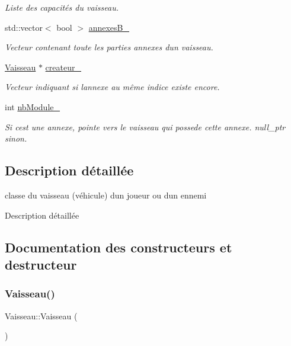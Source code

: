 \begin{DoxyCompactItemize}
\begin{DoxyCompactList}\small\item\em Liste des capacités du vaisseau. \end{DoxyCompactList}\item 
std\+::vector$<$ bool $>$ \hyperlink{class_vaisseau_a584960419ccc6ae137c196a012d7eb9f}{annexes\+B\+\_\+}
\begin{DoxyCompactList}\small\item\em Vecteur contenant toute les parties annexes d\textquotesingle{}un vaisseau. \end{DoxyCompactList}\item 
\hyperlink{class_vaisseau}{Vaisseau} $\ast$ \hyperlink{class_vaisseau_a838e50295284e3b4996640054ab7ee30}{createur\+\_\+}
\begin{DoxyCompactList}\small\item\em Vecteur indiquant si l\textquotesingle{}annexe au même indice existe encore. \end{DoxyCompactList}\item 
int \hyperlink{class_vaisseau_a540cc03e47db59aad60d70be38a010ec}{nb\+Module\+\_\+}
\begin{DoxyCompactList}\small\item\em Si c\textquotesingle{}est une annexe, pointe vers le vaisseau qui possede cette annexe. null\+\_\+ptr sinon. \end{DoxyCompactList}\end{DoxyCompactItemize}


\subsection{Description détaillée}
classe du vaisseau (véhicule) d\textquotesingle{}un joueur ou d\textquotesingle{}un ennemi 

Description détaillée 

\subsection{Documentation des constructeurs et destructeur}
\mbox{\label{class_vaisseau_a86378a70f0d92fcc6c5c5973574b2b7d}} 
\subsubsection{\texorpdfstring{Vaisseau()}{Vaisseau()}}
{\footnotesize\ttfamily Vaisseau\+::\+Vaisseau (\begin{DoxyParamCaption}{ }\end{DoxyParamCaption})}



